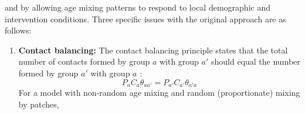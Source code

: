 and by allowing age mixing patterns to respond to local demographic and intervention conditions.
Three specific issues with the original approach are as follows:
\begin{enumerate}
  \item \textbf{Contact balancing:}\label{issue:balance}
  The contact balancing principle states that
  the total number of contacts formed by group $a$ with group $a'$
  should equal the number formed by group $a'$ with group $a$ \cite{Arregui2018}:
  \begin{equation}\label{eq:balance}
    P_{a} C_{a} \theta_{aa'} = P_{a'} C_{a'} \theta_{a'a}
  \end{equation}
  For a model with non-random age mixing and random (proportionate) mixing by patches,

\end{enumerate}
